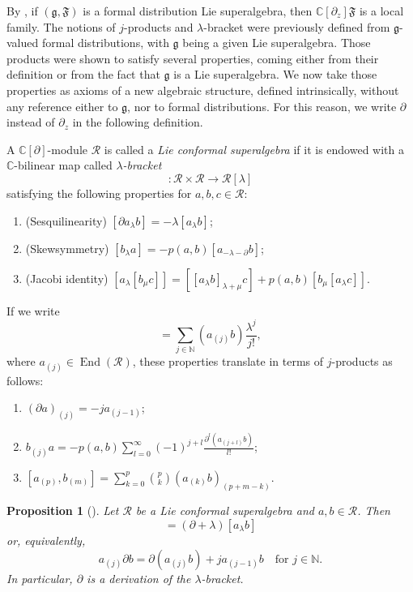 \documentclass[a4paper, 12pt, reqno]{amsart}
\newtheorem{proposition}[theorem]{Proposition}
\theoremstyle{remark}
\numberwithin{equation}{subsection}
\DeclareMathOperator{\End}{End}
\begin{document}
By , if $(\mathfrak{g}, \mathfrak{F})$ is a formal distribution Lie superalgebra, then $\mathbb{C}[\partial_z]\mathfrak{F}$ is a local family.
The notions of $j$-products and $\lambda$-bracket were previously defined from $\mathfrak{g}$-valued formal distributions, with $\mathfrak{g}$ being a given Lie superalgebra.
Those products were shown to satisfy several properties, coming either from their definition or from the fact that $\mathfrak{g}$ is a Lie superalgebra.
We now take those properties as axioms of a new algebraic structure, defined intrinsically, without any reference either to $\mathfrak{g}$, nor to formal distributions.
For this reason, we write $\partial$ instead of $\partial_z$ in the following definition.

A $\mathbb{C}[\partial]$-module $\mathcal{R}$ is called a \emph{Lie conformal superalgebra} if it is endowed with a $\mathbb{C}$-bilinear map called \emph{$\lambda$-bracket}
\begin{equation*}
  [\bullet_{\lambda}\bullet]: \mathcal{R} \times \mathcal{R} \to \mathcal{R}[\lambda]
\end{equation*}
satisfying the following properties for $a, b, c \in \mathcal{R}$:
\begin{enumerate}
\item (Sesquilinearity) $[\partial a_{\lambda}b] = -\lambda[a_{\lambda}b]$;
\item (Skewsymmetry) $[b_{\lambda}a] = -p(a, b)[a_{-\lambda - \partial}b]$;
\item (Jacobi identity) $[a_{\lambda}[b_{\mu}c]] = [[a_{\lambda}b]_{\lambda + \mu}c] + p(a, b)[b_{\mu}[a_{\lambda}c]]$.
\end{enumerate}

If we write
\begin{equation*}
  [a_{\lambda}b] = \sum_{j \in \mathbb{N}}(a_{(j)}b)\frac{\lambda^j}{j!},
\end{equation*}
where $a_{(j)} \in \End(\mathcal{R})$, these properties translate in terms of $j$-products as follows:
\begin{enumerate}
\item $(\partial a)_{(j)} = -ja_{(j - 1)}$;
\item $b_{(j)}a = -p(a, b)\sum_{l = 0}^{\infty}(-1)^{j + l}\frac{\partial^l(a_{(j + l)}b)}{l!}$;
\item $[a_{(p)}, b_{(m)}] = \sum_{k = 0}^p\binom{p}{k}(a_{(k)}b)_{(p + m - k)}$.
\end{enumerate}

\begin{proposition}[{\cite[Remark 2.5.3]{nozaradan_introduction_2008}}]
  \label{prp:4}
  Let $\mathcal{R}$ be a Lie conformal superalgebra and $a, b \in \mathcal{R}$.
  Then
  \begin{equation*}
    [a_{\lambda}\partial b] = (\partial + \lambda)[a_{\lambda}b]
  \end{equation*}
  or, equivalently,
  \begin{equation*}
    a_{(j)}\partial b = \partial(a_{(j)}b) + ja_{(j - 1)}b \quad \text{for }j \in \mathbb{N}.
  \end{equation*}
  In particular, $\partial$ is a derivation of the $\lambda$-bracket.
\end{proposition}
\end{document}
